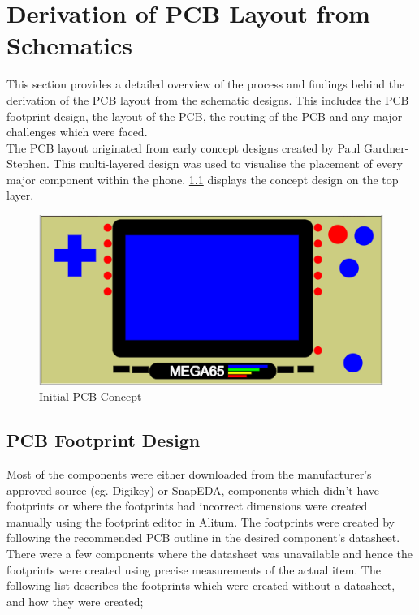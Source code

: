
\chapter{Derivation of PCB Layout from Schematics} %

\label{Chapter6} %

	This section provides a detailed overview of the process and findings behind the derivation of the PCB layout from the schematic designs. This includes the PCB footprint design, the layout of the PCB, the routing of the PCB and any major challenges which were faced.\\
The PCB layout originated from early concept designs created by Paul Gardner-Stephen. This multi-layered design was used to visualise the placement of every major component within the phone. \ref{fig:Concept} displays the concept design on the top layer. 

\begin{figure}
	\includegraphics[width=\linewidth]{Figures/concept.png}
	\caption{Initial PCB Concept}
	\label{fig:Concept}
\end{figure}

\section{PCB Footprint Design}

	Most of the components were either downloaded from the manufacturer's approved source (eg. Digikey) or SnapEDA, components which didn't have footprints or where the footprints had incorrect dimensions were created manually using the footprint editor in Alitum. The footprints were created by following the recommended PCB outline in the desired component's datasheet. There were a few components where the datasheet was unavailable and hence the footprints were created using precise measurements of the actual item. The following list describes the footprints which were created without a datasheet, and how they were created;

